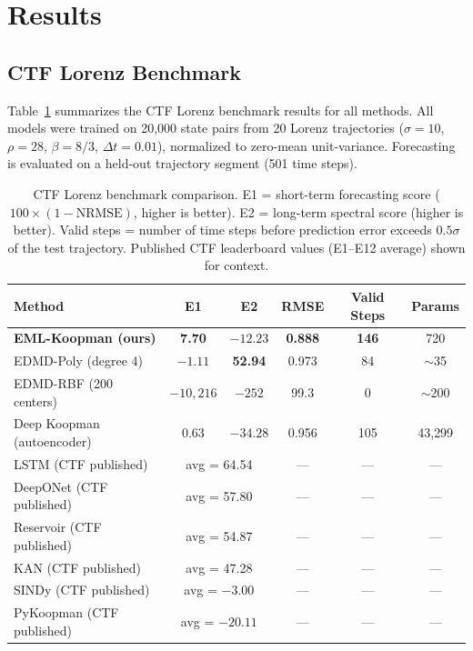 \documentclass[11pt]{article}
\begin{document}
\section{Results}
\label{sec:results}

\subsection{CTF Lorenz Benchmark}

Table~\ref{tab:ctf} summarizes the CTF Lorenz benchmark results for all methods.
All models were trained on 20,000 state pairs from 20 Lorenz trajectories
($\sigma\!=\!10$, $\rho\!=\!28$, $\beta\!=\!8/3$, $\Delta t\!=\!0.01$),
normalized to zero-mean unit-variance.  Forecasting is evaluated on a held-out
trajectory segment (501 time steps).

\begin{table}[t]
\centering
\caption{CTF Lorenz benchmark comparison.  E1 = short-term forecasting score
  ($100 \times (1 - \text{NRMSE})$, higher is better).  E2 = long-term spectral
  score (higher is better).  Valid steps = number of time steps before prediction
  error exceeds $0.5\sigma$ of the test trajectory.  Published CTF leaderboard
  values (E1--E12 average) shown for context.}
\label{tab:ctf}
\begin{tabular}{lccccc}
\toprule
Method & E1 & E2 & RMSE & Valid Steps & Params \\
\midrule
\textbf{EML-Koopman (ours)} & \textbf{7.70} & $-12.23$ & \textbf{0.888} & \textbf{146} & 720 \\
EDMD-Poly (degree 4) & $-1.11$ & \textbf{52.94} & 0.973 & 84 & $\sim$35 \\
EDMD-RBF (200 centers) & $-10{,}216$ & $-252$ & 99.3 & 0 & $\sim$200 \\
Deep Koopman (autoencoder) & 0.63 & $-34.28$ & 0.956 & 105 & 43{,}299 \\
\midrule
LSTM (CTF published) & \multicolumn{2}{c}{avg = 64.54} & --- & --- & --- \\
DeepONet (CTF published) & \multicolumn{2}{c}{avg = 57.80} & --- & --- & --- \\
Reservoir (CTF published) & \multicolumn{2}{c}{avg = 54.87} & --- & --- & --- \\
KAN (CTF published) & \multicolumn{2}{c}{avg = 47.28} & --- & --- & --- \\
SINDy (CTF published) & \multicolumn{2}{c}{avg = $-3.00$} & --- & --- & --- \\
PyKoopman (CTF published) & \multicolumn{2}{c}{avg = $-20.11$} & --- & --- & --- \\
\bottomrule
\end{tabular}
\end{table}
\end{document}
